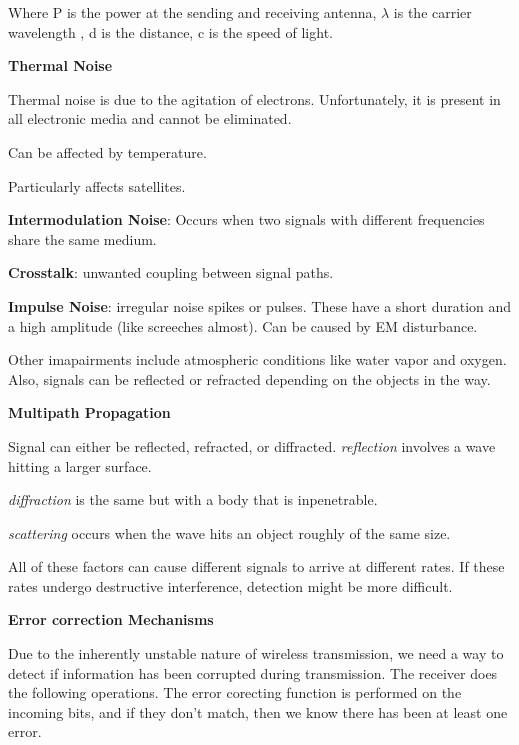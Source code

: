 \documentclass{article}
\begin{document}
Where P is the power at the sending and receiving antenna, $\lambda$ is the carrier wavelength , d is the distance, c is the speed of
light.

\hspace{10mm}\textbf{Thermal Noise}

Thermal noise is due to the agitation of electrons. Unfortunately, it is present in all electronic media and cannot be eliminated.

Can be affected by temperature. 

Particularly affects satellites.

\textbf{Intermodulation Noise}: Occurs when two signals with different frequencies share the same medium.

\textbf{Crosstalk}: unwanted coupling between signal paths.

\textbf{Impulse Noise}: irregular noise spikes or pulses. These have a short duration and a high amplitude (like screeches almost). 
Can be caused by EM disturbance. 

Other imapairments include atmospheric conditions like water vapor and oxygen. Also, signals can be reflected or refracted depending 
on the objects in the way.

\hspace{10mm}\textbf{Multipath Propagation}

Signal can either be reflected, refracted, or diffracted. \textit{reflection} involves a wave hitting a larger surface. 

\textit{diffraction} is the same but with a body that is inpenetrable. 

\textit{scattering} occurs when the wave hits an object roughly of the same size.

All of these factors can cause different signals to arrive at different rates. If these rates undergo destructive interference, 
detection might be more difficult. 


\hspace{10mm}\textbf{Error correction Mechanisms}

Due to the inherently unstable nature of wireless transmission, we need a way to detect if information has been corrupted during
transmission. The receiver does the following operations. The error corecting function is performed on the incoming bits, and 
if they don't match, then we know there has been at least one error. 
\end{document}
